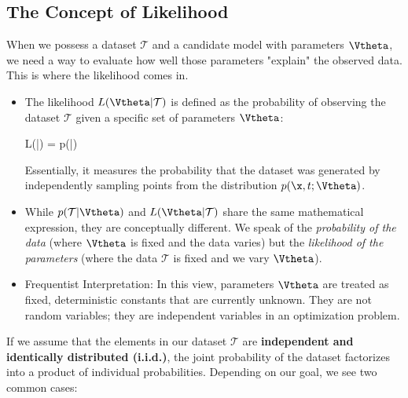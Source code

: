 \subsection*{The Concept of Likelihood}

When we possess a dataset $\mathcal{T}$ and a candidate model with parameters $\Vtheta$, we need a way to evaluate how well those parameters "explain" the observed data. This is where the \alert{likelihood} comes in.

\begin{itemize}
    \item The likelihood $L(\Vtheta|\mathcal{T})$ is defined as the probability of observing the dataset $\mathcal{T}$ given a specific set of parameters $\Vtheta$:
    \begin{myequation}
    L(\Vtheta|) = p(|\Vtheta)
    \end{myequation}
    Essentially, it measures the probability that the dataset was generated by independently sampling points from the distribution $p(\x,t;\Vtheta)$.
    
    \item While $p(\mathcal{T}|\Vtheta)$ and $L(\Vtheta|\mathcal{T})$ share the same mathematical expression, they are conceptually different. We speak of the \textit{probability of the data} (where $\Vtheta$ is fixed and the data varies) but the \textit{likelihood of the parameters} (where the data $\mathcal{T}$ is fixed and we vary $\Vtheta$).
    
    \item Frequentist Interpretation: In this view, parameters $\Vtheta$ are treated as fixed, deterministic constants that are currently unknown. They are not random variables; they are independent variables in an optimization problem.
\end{itemize}


If we assume that the elements in our dataset $\mathcal{T}$ are \textbf{independent and identically distributed (i.i.d.)}, the joint probability of the dataset factorizes into a product of individual probabilities. Depending on our goal, we see two common cases:

